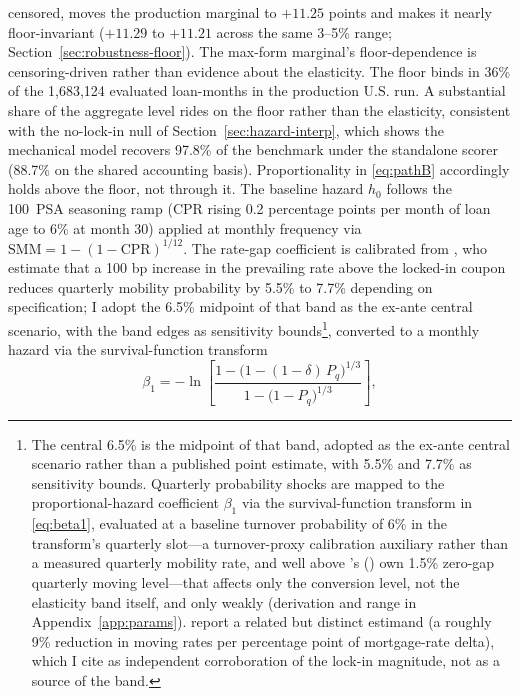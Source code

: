 \documentclass[12pt]{article}
\newcommand{\citepos}[1]{\citeauthor{#1}'s (\citeyear{#1})}
\begin{document}
censored, moves the production marginal to $+11.25$ points and makes it nearly floor-invariant ($+11.29$ to $+11.21$ across the same 3--5\% range; Section~\ref{sec:robustness-floor}). The max-form marginal's floor-dependence is censoring-driven rather than evidence about the elasticity. The floor binds in 36\% of the 1,683,124 evaluated loan-months in the production U.S. run. A substantial share of the aggregate level rides on the floor rather than the elasticity, consistent with the no-lock-in null of Section~\ref{sec:hazard-interp}, which shows the mechanical model recovers 97.8\% of the benchmark under the standalone scorer (88.7\% on the shared accounting basis). Proportionality in \eqref{eq:pathB} accordingly holds above the floor, not through it. The baseline hazard $h_0$ follows the 100~PSA seasoning ramp (CPR rising 0.2 percentage points per month of loan age to 6\% at month 30) applied at monthly frequency via $\mathrm{SMM} = 1-(1-\mathrm{CPR})^{1/12}$. The rate-gap coefficient is calibrated from \citet{liebersohn2024}, who estimate that a 100 bp increase in the prevailing rate above the locked-in coupon reduces quarterly mobility probability by 5.5\% to 7.7\% depending on specification; I adopt the 6.5\% midpoint of that band as the ex-ante central scenario, with the band edges as sensitivity bounds\footnote{The central 6.5\% is the midpoint of that band, adopted as the ex-ante central scenario rather than a published point estimate, with 5.5\% and 7.7\% as sensitivity bounds. Quarterly probability shocks are mapped to the proportional-hazard coefficient $\beta_1$ via the survival-function transform in \eqref{eq:beta1}, evaluated at a baseline turnover probability of 6\% in the transform's quarterly slot---a turnover-proxy calibration auxiliary rather than a measured quarterly mobility rate, and well above \citepos{liebersohn2024} own 1.5\% zero-gap quarterly moving level---that affects only the conversion level, not the elasticity band itself, and only weakly (derivation and range in Appendix~\ref{app:params}). \citet{fonseca2024} report a related but distinct estimand (a roughly 9\% reduction in moving rates per percentage point of mortgage-rate delta), which I cite as independent corroboration of the lock-in magnitude, not as a source of the band.}, converted to a monthly hazard via the survival-function transform
\begin{equation}\label{eq:beta1}
\beta_1 = -\ln\!\left[\frac{1-\big(1-(1-\delta)\,P_q\big)^{1/3}}{1-\big(1-P_q\big)^{1/3}}\right],
\end{equation}
\end{document}
